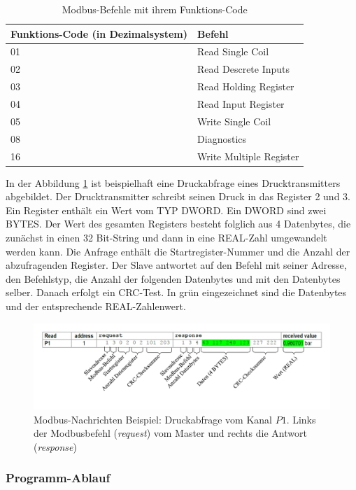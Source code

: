 \begin{table}[htb]
\centering
\caption{Modbus-Befehle mit ihrem Funktions-Code }
\begin{tabular}{ll}
\hline 
\textbf{Funktions-Code (in Dezimalsystem)} & \textbf{Befehl} \\ 
\hline 
\hline
01 & Read Single Coil \\ 
\hline 
02 & Read Descrete Inputs \\ 
\hline 
03 & Read Holding Register \\ 
\hline 
04 & Read Input Register \\ 
\hline 
05 & Write Single Coil \\ 
\hline 
08 & Diagnostics \\ 
\hline 
16 & Write Multiple Register \\ 
\hline 
\hline 
\end{tabular} 
\label{tab:modbus_befehle}
\end{table}

In der Abbildung \ref{fig:ModbusNachrichtBeispiel} ist beispielhaft eine Druckabfrage eines Drucktransmitters abgebildet. Der Drucktransmitter schreibt seinen Druck in das Register 2 und 3. Ein Register enthält ein Wert vom TYP DWORD. Ein DWORD sind zwei BYTES. Der Wert des gesamten Registers besteht folglich aus 4 Datenbytes, die zunächst in einen 32 Bit-String und dann in eine REAL-Zahl umgewandelt werden kann. 
Die Anfrage enthält die Startregister-Nummer und die Anzahl der abzufragenden Register. 
Der Slave antwortet auf den Befehl  mit seiner Adresse, den Befehlstyp, die Anzahl der folgenden Datenbytes und mit den Datenbytes selber. Danach erfolgt ein CRC-Test. In grün eingezeichnet sind die Datenbytes und der entsprechende REAL-Zahlenwert. 

\begin{figure}[htb]
\centering		\includegraphics[width=1.0\textwidth]{Pictures/Versuchsaufbau/ModbusBefehlBeispiel.pdf}
\caption{Modbus-Nachrichten Beispiel: Druckabfrage vom Kanal $P1$. Links der Modbusbefehl (\textit{request}) vom Master und rechts die Antwort (\textit{response})}
\label{fig:ModbusNachrichtBeispiel}
\end{figure}

\subsubsection*{Programm-Ablauf}



